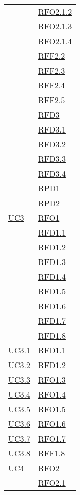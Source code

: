 \begin{longtable}{|>{\centering}m{5cm}|m{5cm}<{\centering}|}
& \hyperlink{RFO2.1.2}{RFO2.1.2}\\
& \hyperlink{RFO2.1.3}{RFO2.1.3}\\
& \hyperlink{RFO2.1.4}{RFO2.1.4}\\
& \hyperlink{RFF2.2}{RFF2.2}\\
& \hyperlink{RFF2.3}{RFF2.3}\\
& \hyperlink{RFF2.4}{RFF2.4}\\
& \hyperlink{RFF2.5}{RFF2.5}\\
& \hyperlink{RFD3}{RFD3}\\
& \hyperlink{RFD3.1}{RFD3.1}\\
& \hyperlink{RFD3.2}{RFD3.2}\\
& \hyperlink{RFD3.3}{RFD3.3}\\
& \hyperlink{RFD3.4}{RFD3.4}\\
& \hyperlink{RPD1}{RPD1}\\
& \hyperlink{RPD2}{RPD2}\\ \hline
\hyperlink{UC3}{UC3} & \hyperlink{RFO1}{RFO1}\\
& \hyperlink{RFD1.1}{RFD1.1}\\
& \hyperlink{RFD1.2}{RFD1.2}\\
& \hyperlink{RFO1.3}{RFD1.3}\\
& \hyperlink{RFO1.4}{RFD1.4}\\
& \hyperlink{RFO1.5}{RFD1.5}\\
& \hyperlink{RFO1.6}{RFD1.6}\\
& \hyperlink{RFO1.7}{RFD1.7}\\
& \hyperlink{RFF1.8}{RFD1.8}\\ \hline
\hyperlink{UC3.1}{UC3.1} & \hyperlink{RFD1.1}{RFD1.1}\\\hline
\hyperlink{UC3.2}{UC3.2} & \hyperlink{RFD1.2}{RFD1.2}\\\hline
\hyperlink{UC3.3}{UC3.3} & \hyperlink{RFO1.3}{RFO1.3}\\\hline
\hyperlink{UC3.4}{UC3.4} & \hyperlink{RFO1.4}{RFO1.4}\\\hline
\hyperlink{UC3.5}{UC3.5} & \hyperlink{RFO1.5}{RFO1.5}\\\hline
\hyperlink{UC3.6}{UC3.6} & \hyperlink{RFO1.6}{RFO1.6}\\\hline
\hyperlink{UC3.7}{UC3.7} & \hyperlink{RFO1.7}{RFO1.7}\\\hline
\hyperlink{UC3.8}{UC3.8} & \hyperlink{RFF1.8}{RFF1.8}\\\hline
\hyperlink{UC4}{UC4} & \hyperlink{RFO2}{RFO2}\\
& \hyperlink{RFO2.1}{RFO2.1}\\

\end{longtable}
